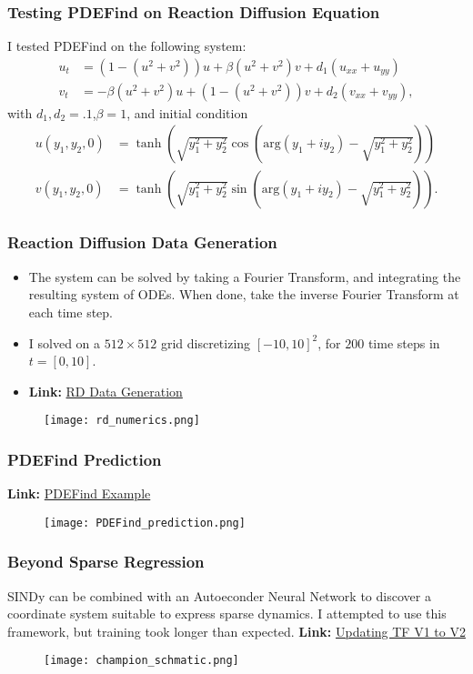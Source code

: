 \documentclass[]{beamer}
\begin{document}
\begin{frame}
    \frametitle{Testing PDEFind on Reaction Diffusion Equation}
    I tested PDEFind on the following system:
    \begin{align*}
    u_t &= \left(1-(u^2+v^2) \right)u + \beta(u^2+v^2)v + d_1(u_{xx}+u_{yy})\\
    v_t &= -\beta(u^2+v^2)u + \left(1-(u^2+v^2)\right)v + d_2(v_{xx}+v_{yy}),
    \end{align*}
with $d_1,d_2=.1$,$\beta = 1$, and initial condition
\begin{align*}
    u(y_1,y_2,0)&= \tanh\left(\sqrt{y_1^2+y_2^2}\cos\left(\text{arg}(y_1+iy_2)-\sqrt{y_1^2+y_2^2}\right)\right)\\
    v(y_1,y_2,0) &= \tanh\left(\sqrt{y_1^2+y_2^2}\sin\left(\text{arg}(y_1+iy_2)-\sqrt{y_1^2+y_2^2}\right)\right).
\end{align*}
\end{frame}
\begin{frame}
    \frametitle{Reaction Diffusion Data Generation}
    \begin{itemize}
        \item The system can be solved by taking a Fourier Transform, and integrating the resulting system of ODEs. When done, take the inverse Fourier Transform at each time step.
        \item I solved on a $512 \times 512$ grid discretizing $[-10,10]^2$, for $200$ time steps in $t=[0,10]$. 
        \item \textbf{Link:}  \href{https://github.com/EMcDugald/convection_patterns/blob/master/code/scripts/solve_reaction_diffusion_champion.py}{RD Data Generation}
    \end{itemize}
 \begin{figure}
        \centering
        \texttt{[image: rd\_numerics.png]}
    \end{figure}

\end{frame}
\begin{frame}
    \frametitle{PDEFind Prediction}
    \textbf{Link:}  \href{https://github.com/EMcDugald/convection_patterns/blob/master/code/PDEFIND/reaction_diffusion_v2.ipynb}{PDEFind Example}
 \begin{figure}
        \centering
        \texttt{[image: PDEFind\_prediction.png]}
    \end{figure}
\end{frame}

\begin{frame}
    \frametitle{Beyond Sparse Regression}
    SINDy can be combined with an Autoeconder Neural Network to discover a coordinate system suitable to express sparse dynamics. I attempted to use this framework, but training took longer than expected. \textbf{Link:}  \href{https://github.com/EMcDugald/convection_patterns/tree/master/code/champion_codes}{Updating TF V1 to V2}
 \begin{figure}
        \centering
        \texttt{[image: champion\_schmatic.png]}
    \end{figure}
\end{frame}
\end{document}
